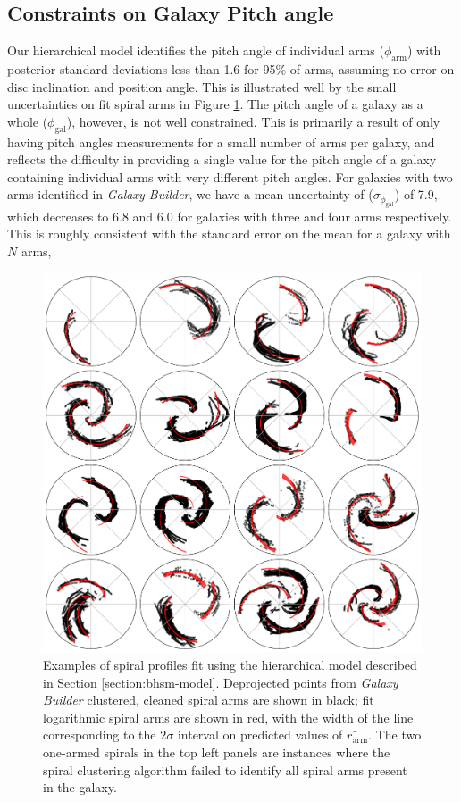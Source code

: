 \subsection{Constraints on Galaxy Pitch angle}
\label{section:constraints-on-galaxy-phi}
Our hierarchical model identifies the pitch angle of individual arms ($\phi_\mathrm{arm}$) with posterior standard deviations less than {1.6\degree} for 95\% of arms, assuming no error on disc inclination and position angle. This is illustrated well by the small uncertainties on fit spiral arms in Figure \ref{fig:example-spiral-fits}. The pitch angle of a galaxy as a whole ($\phi_\mathrm{gal}$), however, is not well constrained. This is primarily a result of only having pitch angles measurements for a small number of arms per galaxy, and reflects the difficulty in providing a single value for the pitch angle of a galaxy containing individual arms with very different pitch angles. For galaxies with two arms identified in \textit{Galaxy Builder}, we have a mean uncertainty of ($\sigma_{\phi_\mathrm{gal}}$) of  {7.9\degree}, which decreases to {6.8\degree} and {6.0\degree} for galaxies with three and four arms respectively. This is roughly consistent with the standard error on the mean for a galaxy with $N$ arms,

\begin{figure}
  \includegraphics[width=17.7cm]{plots/example-spiral-fits.pdf}
  \caption{Examples of spiral profiles fit using the hierarchical model described in Section \ref{section:bhsm-model}. Deprojected points from \textit{Galaxy Builder} clustered, cleaned spiral arms are shown in black; fit logarithmic spiral arms are shown in red, with the width of the line corresponding to the $2\sigma$ interval on predicted values of $\widetilde{r_\mathrm{arm}}$. The two one-armed spirals in the top left panels are instances where the spiral clustering algorithm failed to identify all spiral arms present in the galaxy.}
  \label{fig:example-spiral-fits}
\end{figure}

